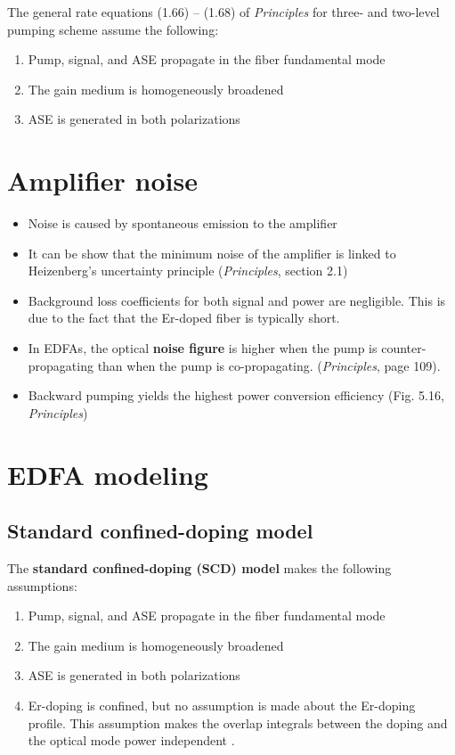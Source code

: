 \documentclass[a4paper]{article}
\begin{document}
The general rate equations (1.66) -- (1.68) of \textit{Principles} for three- and two-level pumping scheme assume the following:
\begin{enumerate}
	\item Pump, signal, and ASE propagate in the fiber fundamental mode 
	\item The gain medium is homogeneously broadened 
	\item ASE is generated in both polarizations
\end{enumerate}

\section{Amplifier noise}
\begin{itemize}
	\item Noise is caused by spontaneous emission to the amplifier
	\item It can be show that the minimum noise of the amplifier is linked to Heizenberg's uncertainty principle (\textit{Principles}, section 2.1) 
	\item Background loss coefficients for both signal and power are negligible. This is due to the fact that the Er-doped fiber is typically short.
	\item In EDFAs, the optical \textbf{noise figure} is higher when the pump is counter-propagating than when the pump is co-propagating. (\textit{Principles}, page 109).
	\item Backward pumping yields the highest power conversion efficiency (Fig. 5.16, \textit{Principles})
\end{itemize}

\newpage
\section{EDFA modeling}

\subsection{Standard confined-doping model}

The \textbf{standard confined-doping (SCD) model} makes the following assumptions:

\begin{enumerate}
	\item Pump, signal, and ASE propagate in the fiber fundamental mode 
	\item The gain medium is homogeneously broadened 
	\item ASE is generated in both polarizations
	\item Er-doping is confined, but no assumption is made about the Er-doping profile. This assumption makes the overlap integrals between the doping and the optical mode power independent \cite{Giles1991, edfa_device}.
\end{enumerate}
\end{document}
